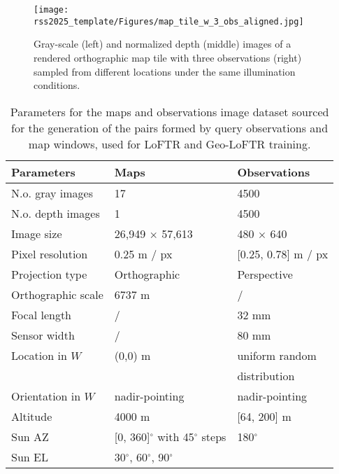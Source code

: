 \begin{figure}
    \centering
    \begin{minipage}[b]{0.9\linewidth}
        \centering
        \texttt{[image: rss2025\_template/Figures/map\_tile\_w\_3\_obs\_aligned.jpg]}
    \end{minipage}
    \caption{\label{fig:map_tile_w_obs} Gray-scale (left) and normalized depth (middle) images of a rendered orthographic map tile with three observations (right) sampled from different locations under the same illumination conditions.}
\end{figure}


\begin{table}
\centering
\begin{tabular}{l l l}
\textbf{Parameters} & \textbf{Maps} & \textbf{Observations} \\ \hline 
N.o. gray images & 17 & 4500 \\
N.o. depth images & 1 & 4500 \\
Image size & 26,949 $\times$ 57,613  & 480 $\times$ 640  \\ 
Pixel resolution & 0.25 m / px  &  [0.25, 0.78] m / px \\
Projection type  & Orthographic & Perspective \\  
Orthographic scale & 6737 m & / \\
Focal length & / & 32 mm \\
Sensor width & / & 80 mm \\
Location in $W$ & (0,0) m &  uniform random \\
&  &  distribution \\
Orientation in $W$ & nadir-pointing & nadir-pointing \\
Altitude & 4000 m & [64, 200] m\\
Sun AZ   & [0, 360]$^{\circ}$ with 45$^{\circ}$ steps & 180$^{\circ}$ \\  
Sun EL & 30$^{\circ}$, 60$^{\circ}$, 90$^{\circ}$ \\  
\end{tabular}
\caption{\label{tab:dataset_params} Parameters for the maps and observations image dataset sourced for the generation of the pairs formed by query observations and map windows, used for LoFTR and Geo-LoFTR training.}
\end{table}






